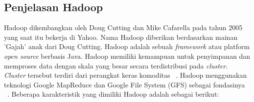 \subsection{Penjelasan Hadoop}

Hadoop dikembangkan oleh Doug Cutting dan Mike Cafarella pada tahun 2005 yang saat itu bekerja di Yahoo. Nama Hadoop diberikan berdasarkan mainan 'Gajah' anak dari Doug Cutting. Hadoop adalah sebuah \textit{framework} atau platform \textit{open source} berbasis Java. Hadoop memiliki kemampuan untuk penyimpanan dan memproses data dengan skala yang besar secara terdistribusi pada {\it cluster}. {\it Cluster} tersebut terdiri dari perangkat keras komoditas ~\cite{alexholmes:04:hip}. Hadoop menggunakan teknologi Google MapReduce dan Google File System (GFS) sebagai fondasinya ~\cite{tomwhite:05:htdg}. Beberapa karakteristik yang dimiliki Hadoop adalah sebagai berikut:


